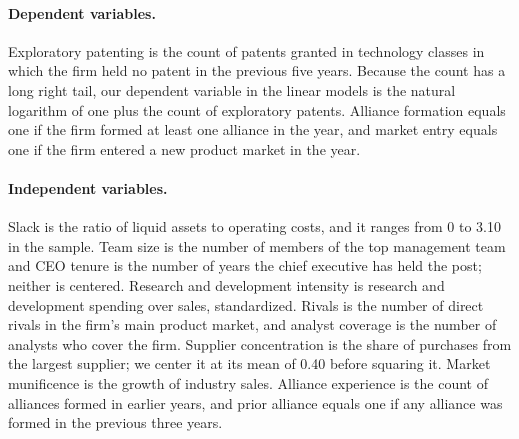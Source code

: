 \documentclass[11pt]{article}
\begin{document}
\paragraph{Dependent variables.} Exploratory patenting is the count of patents granted in technology classes in which the firm held no patent in the previous five years. Because the count has a long right tail, our dependent variable in the linear models is the natural logarithm of one plus the count of exploratory patents. Alliance formation equals one if the firm formed at least one alliance in the year, and market entry equals one if the firm entered a new product market in the year.

\paragraph{Independent variables.} Slack is the ratio of liquid assets to operating costs, and it ranges from 0 to 3.10 in the sample. Team size is the number of members of the top management team and CEO tenure is the number of years the chief executive has held the post; neither is centered. Research and development intensity is research and development spending over sales, standardized. Rivals is the number of direct rivals in the firm's main product market, and analyst coverage is the number of analysts who cover the firm. Supplier concentration is the share of purchases from the largest supplier; we center it at its mean of 0.40 before squaring it. Market munificence is the growth of industry sales. Alliance experience is the count of alliances formed in earlier years, and prior alliance equals one if any alliance was formed in the previous three years.
\end{document}
